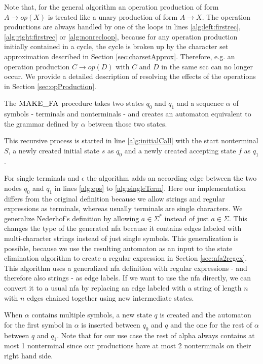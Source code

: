 Note that, for the general algorithm an operation production of form $A \rightarrow op(X)$ is treated like a unary production of form $A \rightarrow X$. The operation productions are always handled by one of the loops in lines \ref{alg:left:firstrec}, \ref{alg:right:firstrec} or \ref{alg:nonrecloop}, because for any operation production initially contained in a cycle, the cycle is broken up by the character set approximation described in Section \ref{sec:charsetApprox}.
Therefore, e.g. an operation production $C \rightarrow op(D)$ with $C$ and $D$ in the same \ac{scc} can no longer occur.
We provide a detailed description of resolving the effects of the operations in Section \ref{sec:opProduction}.

The $\textproc{MAKE\_FA}$ procedure takes two states $q_0$ and $q_1$ and a sequence $\alpha$ of symbols - terminals and nonterminals - and creates an automaton equivalent to the grammar defined by $\alpha$ between those two states.

This recursive process is started in line \ref{alg:initialCall} with the start nonterminal $S$, a newly created initial state $s$ as $q_0$ and a newly created accepting state $f$ as $q_1$.

For single terminals and $\epsilon$ the algorithm adds an according edge between the two nodes $q_0$ and $q_1$ in lines \ref{alg:eps} to \ref{alg:singleTerm}.
Here our implementation differs from the original definition because we allow strings and regular expressions as terminals, whereas usually terminals are single characters. We generalize Nederhof's definition by allowing $a \in \Sigma^*$ instead of just $a \in \Sigma$.
This changes the type of the generated \ac{nfa} because it contains edges labeled with multi-character strings instead of just single symbols. This generalization is possible, because we use the resulting automaton as an input to the state elimination algorithm to create a regular expression in Section \ref{sec:nfa2regex}. This algorithm uses a generalized \ac{nfa} definition with regular expressions - and therefore also strings - as edge labels. If we want to use the \ac{nfa} directly, we can convert it to a usual \ac{nfa} by replacing an edge labeled with a string of length $n$ with $n$ edges chained together using new intermediate states.

When $\alpha$ contains multiple symbols, a new state $q$ is created and the automaton for the first symbol in $\alpha$ is inserted between $q_0$ and $q$ and the one for the rest of $\alpha$ between $q$ and $q_1$. Note that for our use case the rest of alpha always contains at most 1 nonterminal since our productions have at most 2 nonterminals on their right hand side.

